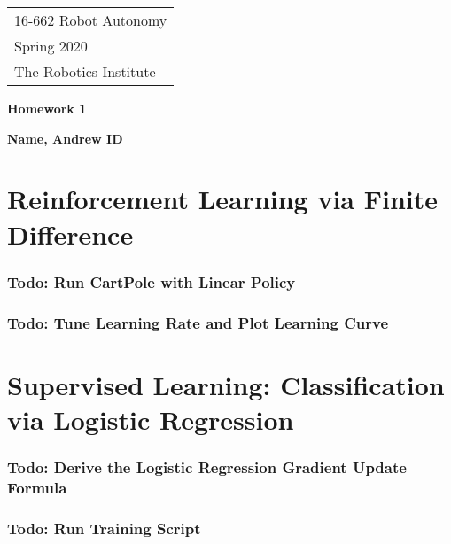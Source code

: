 \lVert\documentclass[11pt]{article} \usepackage{fullpage} \usepackage{graphicx} \usepackage{epstopdf} \usepackage{color} \usepackage{psfrag} \usepackage{pdfsync}
\begin{document}
{\parindent 0pt \begin{tabular}[t]{l} 16-662 Robot Autonomy \\ Spring 2020 \\ The Robotics Institute \end{tabular}}%
\parindent 0pt \parskip 8pt
\begin{center} \large\bf Homework 1 \end{center}
\begin{center} \large\bf Name, Andrew ID \end{center}
\bigskip


\section{Reinforcement Learning via Finite Difference}

\setcounter{subsection}{1}
\setcounter{subsubsection}{1}
\subsubsection{Todo: Run CartPole with Linear Policy}


\setcounter{subsection}{2}
\subsubsection{Todo: Tune Learning Rate and Plot Learning Curve}

\section{Supervised Learning: Classification via Logistic Regression}

\setcounter{subsection}{1}
\subsubsection{Todo: Derive the Logistic Regression Gradient Update Formula}

\setcounter{subsection}{3}
\setcounter{subsubsection}{1}
\subsubsection{Todo: Run Training Script}
\end{document}
